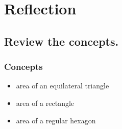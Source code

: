 \documentclass{beamer} %
\begin{document}
\setcounter{equation}{0} %

\section{Reflection}

\subsection*{Review the concepts.}

\begin{frame}
  \frametitle{Concepts}
  \begin{itemize}
    \item area of an equilateral triangle
    \item<2-> area of a rectangle
    \item<3-> area of a regular hexagon
  \end{itemize}
\end{frame}
\end{document}
